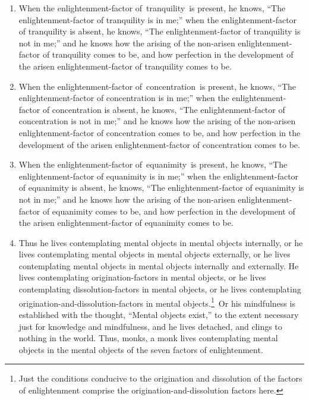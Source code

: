 \begin{enumerate}[resume]
\pagebreak
\item When the enlightenment-factor of tranquility is present, he knows, “The enlightenment-factor of tranquility is in me;” when the enlightenment-factor of tranquility is absent, he knows, “The enlightenment-factor of tranquility is not in me;” and he knows how the arising of the non-arisen enlightenment-factor of tranquility comes to be, and how perfection in the development of the arisen enlightenment-factor of tranquility comes to be.
\item When the enlightenment-factor of concentration is present, he knows, “The enlightenment-factor of concentration is in me;” when the enlightenment-factor of concentration is absent, he knows, “The enlightenment-factor of concentration is not in me;” and he knows how the arising of the non-arisen enlightenment-factor of concentration comes to be, and how perfection in the development of the arisen enlightenment-factor of concentration comes to be.
\item When the enlightenment-factor of equanimity is present, he knows, “The enlightenment-factor of equanimity is in me;” when the enlightenment-factor of equanimity is absent, he knows, “The enlightenment-factor of equanimity is not in me;” and he knows how the arising of the non-arisen enlightenment-factor of equanimity comes to be, and how perfection in the development of the arisen enlightenment-factor of equanimity comes to be.
\item Thus he lives contemplating mental objects in mental objects internally, or he lives contemplating mental objects in mental objects externally, or he lives contemplating mental objects in mental objects internally and externally. He lives contemplating origination-factors in mental objects, or he lives contemplating dissolution-factors in mental objects, or he lives contemplating origination-and-dissolution-factors in mental objects.\footnote{Just the conditions conducive to the origination and dissolution of the factors of enlightenment comprise the origination-and-dissolution factors here.} Or his mindfulness is established with the thought, “Mental objects exist,” to the extent necessary just for knowledge and mindfulness, and he lives detached, and clings to nothing in the world. Thus, monks, a monk lives contemplating mental objects in the mental objects of the seven factors of enlightenment.
\end{enumerate}
